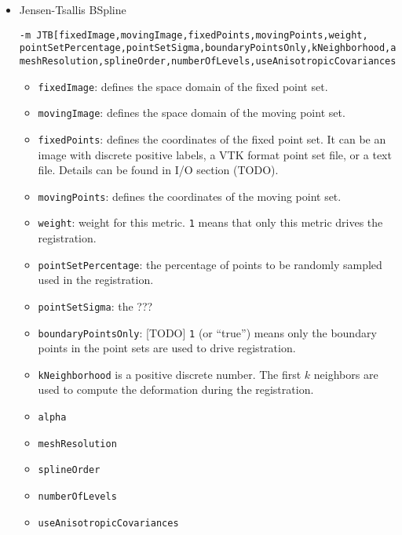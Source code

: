 \begin{itemize}
    \item Jensen-Tsallis BSpline
    \begin{verbatim}
-m JTB[fixedImage,movingImage,fixedPoints,movingPoints,weight,
pointSetPercentage,pointSetSigma,boundaryPointsOnly,kNeighborhood,alpha,
meshResolution,splineOrder,numberOfLevels,useAnisotropicCovariances] 
    \end{verbatim}
    \begin{itemize}
        \item \verb"fixedImage": defines the space domain of the fixed point set.
        \item \verb"movingImage": defines the space domain of the moving point set.
        \item \verb"fixedPoints": defines the coordinates of the fixed point set. It can be an image with discrete positive labels, a VTK format point set file, or a text file. Details can be found in I/O section (TODO).
        \item \verb"movingPoints": defines the coordinates of the moving point set.
        \item \verb"weight": weight for this metric. \verb"1" means that only this metric drives the registration.
        \item \verb"pointSetPercentage": the percentage of points to be randomly sampled used in the registration.
        \item \verb"pointSetSigma": the ??? 
        \item \verb"boundaryPointsOnly": [TODO] \verb"1" (or ``true'') means only the boundary points in the point sets are used to drive registration.
        \item \verb"kNeighborhood" is a positive discrete number. The first $k$ neighbors are used to compute the deformation during the registration. 
        \item \verb"alpha"
        \item \verb"meshResolution"
        \item \verb"splineOrder"
        \item \verb"numberOfLevels"
        \item \verb"useAnisotropicCovariances"
    \end{itemize}

\end{itemize}

